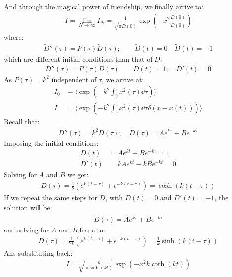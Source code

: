 \documentclass[../template.tex]{subfiles}
\begin{document}
And through the magical power of friendship, we finally arrive to:
\begin{align*}
    I = \lim_{N \to \infty} I_N = \frac{1}{\sqrt{\pi \widetilde{D}(0)}} \exp\left(-x^2 \frac{D(0)}{\widetilde{D}(0)} \right) 
\end{align*}
where:
\begin{align*}
    \widetilde{D}''(\tau) = P(\tau) \widetilde{D}(\tau); \qquad \widetilde{D}(t) = 0 \quad \widetilde{D}(t) = -1
\end{align*}
which are different initial conditions than that of $D$:
\begin{align*}
    D''(\tau) = P(\tau) D(\tau) \qquad D(t)=1; \quad D'(t) = 0
\end{align*} 
As $P(\tau) = k^2$ independent of $\tau$, we arrive at:
\begin{align*}
    I_0 &= \langle \exp\left({-k^2} \int_0^t x^2 (\tau) \dd{\tau}\right) \rangle \\
    I &= \langle \exp\left(-k^2 \int_0^t x^2(\tau) \dd{\tau} \delta(x- x(t))\right) \rangle
\end{align*}  
Recall that:
\begin{align*}
    D''(\tau) = k^2 D(\tau); \quad D(\tau) = A e^{k \tau} + B e^{-k \tau}
\end{align*}
Imposing the initial conditions:
\begin{align*}
    D(t) &= Ae^{kt} + Be^{-kt} = 1\\
    D'(t) &= kAe^{kt} - kB e^{-kt} = 0
\end{align*}
Solving for $A$ and $B$ we get:
\begin{align*}
    D(\tau) = \frac{1}{2} (e^{k(t- \tau)} + e^{-k(t - \tau)}) = \cosh (k(t- \tau))
\end{align*}  
If we repeat the same steps for $\widetilde{D}$, with $\widetilde{D}(t) = 0$ and $\widetilde{D}'(t) = -1$, the solution will be:
\begin{align*}
    \widetilde{D}(\tau) = \widetilde{A} e^{k \tau} + \widetilde{B} e^{-k \tau}
\end{align*} 
and solving for $\widetilde{A}$ and $\widetilde{B}$ leads to:
\begin{align*}
    D(\tau) = \frac{1}{2 k}(e^{k(t-\tau)} + e^{-k(t-\tau)})  = \frac{1}{k}\sinh(k(t-\tau)) 
\end{align*}    
Ans substituting back:
\begin{align*}
    I = \sqrt{\frac{k}{\pi \sinh(kt)}} \exp\left(-x^2 k \coth (kt)\right)
\end{align*}
\end{document}
